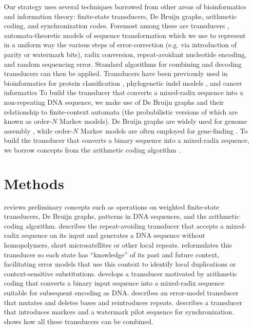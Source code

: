 \documentclass[english]{article}
\begin{document}
Our strategy uses several techniques borrowed from other areas of bioinformatics and information theory:
finite-state transducers, De Bruijn graphs, arithmetic coding, and synchronization codes.
Foremost among these are transducers \cite{MohriPereiraRiley2000,WikipediaTransducers}, automata-theoretic models of sequence transformation
which we use to represent in a uniform way the various steps of error-correction (e.g. via introduction of parity or watermark bits),
radix conversion, repeat-avoidant nucleotide encoding, and random sequencing error.
Standard algorithms for combining and decoding transducers can then be applied.
Transducers have been previously used in bioinformatics for
protein classification \cite{EskinEtAl2000},
phylogenetic indel models \cite{PatenEtAl2008,WestessonEtAlArxiv2012,WestessonEtAl2012},
and cancer informatics \cite{SchwarzEtAl2014}
To build the transducer that converts a mixed-radix sequence into a non-repeating DNA sequence,
we make use of De Bruijn graphs
and their relationship to finite-context automata (the probabilistic versions of which are known as order-$N$ Markov models).
De Bruijn graphs are widely used for genome assembly \cite{DeBruijn1946,PevznerEtAl2001,ZerbinoBirney2008,IqbalEtAl2012},
while order-$N$ Markov models are often employed for gene-finding \cite{BurgeKarlin1997,SalzbergEtAl1999}.
To build the transducer that converts a binary sequence into a mixed-radix sequence,
we borrow concepts from the arithmetic coding algorithm \cite{Rissanen1976,Mackay2003}.

\section{Methods}

 reviews preliminary concepts such as operations on weighted finite-state transducers,
De Bruijn graphs, patterns in DNA sequences, and the arithmetic coding algorithm.
 describes the repeat-avoiding transducer that accepts a mixed-radix sequence on its input
and generates a DNA sequence without homopolymers, short microsatellites or other local repeats.
 reformulates this transducer so each state has ``knowledge'' of its past and future context,
facilitating error models that use this context to identify local duplications or context-sensitive substitutions.
 develops a transducer motivated by arithmetic coding
that converts a binary input sequence into a mixed-radix sequence suitable for subsequent encoding as DNA.
 describes an error-model transducer that mutates and deletes bases and reintroduces repeats.
 describes a transducer that introduces markers and a watermark pilot sequence for synchronization.
 shows how all these transducers can be combined.
\end{document}
